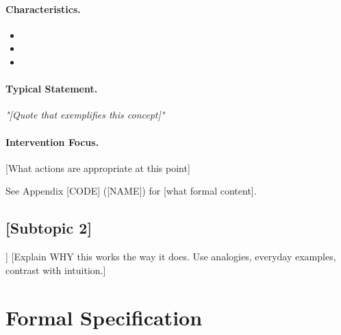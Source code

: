 \paragraph{Characteristics.}
\begin{itemize}
    \item [Property 1]
    \item [Property 2]
    \item [Property 3]
\end{itemize}

\paragraph{Typical Statement.}
\textit{"[Quote that exemplifies this concept]"}

\paragraph{Intervention Focus.}
[What actions are appropriate at this point]

\begin{cross-reference}
See Appendix [CODE] ([NAME]) for [what formal content].
\end{cross-reference}


\subsection{[Subtopic 2]}
\label{sec:[label]-[subtopic2]}


\begin{intuition}[[Insight Title]]
[Explain WHY this works the way it does.
Use analogies, everyday examples, contrast with intuition.]
\end{intuition}



\section{Formal Specification}
\label{sec:[label]-formal}


